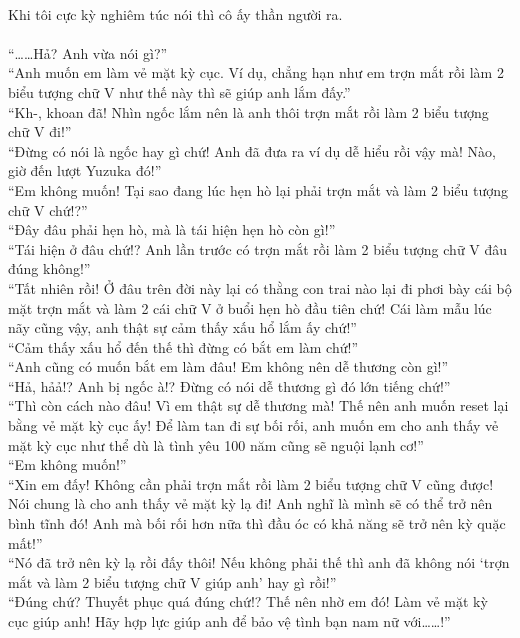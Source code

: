 \documentclass[12pt,a4paper, twosides]{book}
\begin{document}
\\
Khi tôi cực kỳ nghiêm túc nói thì cô ấy thần người ra.\\
\\
“……Hả? Anh vừa nói gì?”\\
“Anh muốn em làm vẻ mặt kỳ cục. Ví dụ, chẳng hạn như em trợn mắt rồi làm 2 biểu tượng chữ V như thế này thì sẽ giúp anh lắm đấy.”\\
“Kh-, khoan đã! Nhìn ngốc lắm nên là anh thôi trợn mắt rồi làm 2 biểu tượng chữ V đi!”\\
“Đừng có nói là ngốc hay gì chứ! Anh đã đưa ra ví dụ dễ hiểu rồi vậy mà! Nào, giờ đến lượt Yuzuka đó!”\\
“Em không muốn! Tại sao đang lúc hẹn hò lại phải trợn mắt và làm 2 biểu tượng chữ V chứ!?”\\
“Đây đâu phải hẹn hò, mà là tái hiện hẹn hò còn gì!”\\
“Tái hiện ở đâu chứ!? Anh lần trước có trợn mắt rồi làm 2 biểu tượng chữ V đâu đúng không!”\\
“Tất nhiên rồi! Ở đâu trên đời này lại có thằng con trai nào lại đi phơi bày cái bộ mặt trợn mắt và làm 2 cái chữ V ở buổi hẹn hò đầu tiên chứ! Cái làm mẫu lúc nãy cũng vậy, anh thật sự cảm thấy xấu hổ lắm ấy chứ!”\\
“Cảm thấy xấu hổ đến thế thì đừng có bắt em làm chứ!”\\
“Anh cũng có muốn bắt em làm đâu! Em không nên dễ thương còn gì!”\\
“Hả, hảả!? Anh bị ngốc à!? Đừng có nói dễ thương gì đó lớn tiếng chứ!”\\
“Thì còn cách nào đâu! Vì em thật sự dễ thương mà! Thế nên anh muốn reset lại bằng vẻ mặt kỳ cục ấy! Để làm tan đi sự bối rối, anh muốn em cho anh thấy vẻ mặt kỳ cục như thể dù là tình yêu 100 năm cũng sẽ nguội lạnh cơ!”\\
“Em không muốn!”\\
“Xin em đấy! Không cần phải trợn mắt rồi làm 2 biểu tượng chữ V cũng được! Nói chung là cho anh thấy vẻ mặt kỳ lạ đi! Anh nghĩ là mình sẽ có thể trở nên bình tĩnh đó! Anh mà bối rối hơn nữa thì đầu óc có khả năng sẽ trở nên kỳ quặc mất!”\\
“Nó đã trở nên kỳ lạ rồi đấy thôi! Nếu không phải thế thì anh đã không nói ‘trợn mắt và làm 2 biểu tượng chữ V giúp anh’ hay gì rồi!”\\
“Đúng chứ? Thuyết phục quá đúng chứ!? Thế nên nhờ em đó! Làm vẻ mặt kỳ cục giúp anh! Hãy hợp lực giúp anh để bảo vệ tình bạn nam nữ với……!”\\
\\
\end{document}
